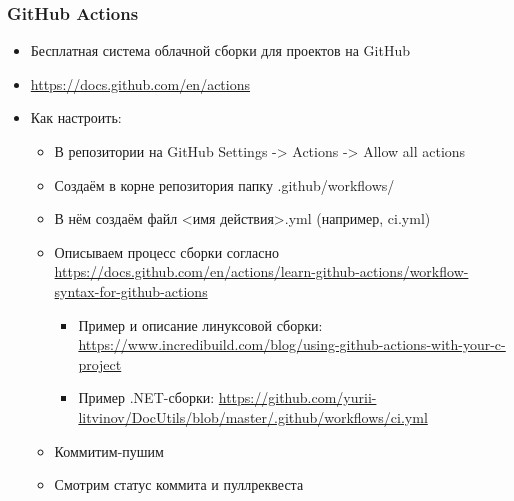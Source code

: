 \documentclass{../../slides-style}
\begin{document}
    \begin{frame}
        \frametitle{GitHub Actions}
        \begin{itemize}
            \item Бесплатная система облачной сборки для проектов на GitHub
            \item \url{https://docs.github.com/en/actions}
            \item Как настроить:
            \begin{itemize}
                \item В репозитории на GitHub Settings -> Actions -> Allow all actions
                \item Создаём в корне репозитория папку .github/workflows/
                \item В нём создаём файл <имя действия>.yml (например, ci.yml)
                \item Описываем процесс сборки согласно \url{https://docs.github.com/en/actions/learn-github-actions/workflow-syntax-for-github-actions}
                \begin{itemize}
                    \item Пример и описание линуксовой сборки: \url{https://www.incredibuild.com/blog/using-github-actions-with-your-c-project}
                    \item Пример .NET-сборки: \url{https://github.com/yurii-litvinov/DocUtils/blob/master/.github/workflows/ci.yml}
                \end{itemize}
                \item Коммитим-пушим
                \item Смотрим статус коммита и пуллреквеста
            \end{itemize}
        \end{itemize}
    \end{frame}
\end{document}
